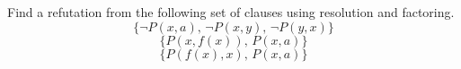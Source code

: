 \documentclass{supervision}
\begin{document}
\begin{questions}
    \question Find a refutation from the following set of clauses using
      resolution and factoring.
      \begin{equation*}
        \{ \lnot P(x, a),\, \lnot P(x, y),\, \lnot P(y,x) \}
      \end{equation*}
      \begin{equation*}
        \{ P(x, f(x)),\, P(x,a) \}
      \end{equation*}
      \begin{equation*}
        \{ P(f(x), x),\, P(x,a) \}
      \end{equation*}


  \end{questions}
\end{document}
